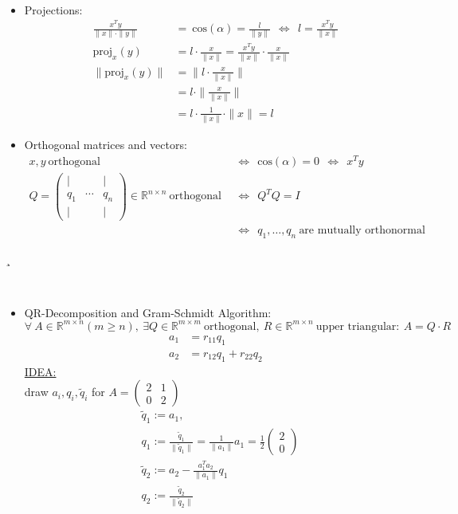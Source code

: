 \begin{frame}
	~\\
	{\blank
		\begin{itemize}\blank
			\item Projections:
			\begin{align*}
			\frac{x^Ty}{\|x\|\cdot\|y\|}&=~\text{cos}(\alpha) = \frac{l}{\|y\|}~~\Leftrightarrow~~l=\frac{x^Ty}{\|x\|}\\
			\text{proj}_x(y)&=l\cdot\frac{x}{\|x\|}=\frac{x^Ty}{\|x\|}\cdot\frac{x}{\|x\|}\\
			\|\text{proj}_x(y)\|&=\|l\cdot\frac{x}{\|x\|}\|\\
			&=l\cdot\|\frac{x}{\|x\|}\|\\
			&=l\cdot\frac{1}{\|x\|}\cdot \|x\|=l
			\end{align*}
			\item Orthogonal matrices and vectors:
			\begin{align*}
			x,y~\text{orthogonal}~~&\Leftrightarrow~~\text{cos}(\alpha)=0~~\Leftrightarrow~~x^Ty\\
			Q=\begin{pmatrix}
			|&~&|\\q_1&\cdots&q_n\\|&~&|
			\end{pmatrix}\in\mathbb{R}^{n\times n}~\text{orthogonal}~~&\Leftrightarrow~~Q^TQ = I\\
			&\Leftrightarrow~~q_1,\dots,q_n~\text{are mutually orthonormal}
			\end{align*}
		\end{itemize}¸
	}
\end{frame}

\begin{frame}
	~\\
	{\blank
		\begin{itemize}\blank
			\item QR-Decomposition and Gram-Schmidt Algorithm:\\
			$\forall~A\in\mathbb{R}^{m\times n} (m\geq n),~\exists Q\in\mathbb{R}^{m\times m}~\text{orthogonal},~R\in\mathbb{R}^{m\times n}~\text{upper triangular}:~A=Q\cdot R$
			\begin{align*}
			a_1 &= r_{11}q_1\\
			a_2 &=r_{12}q_1+r_{22}q_2
			\end{align*}
			\underline{IDEA:}\\
			draw $a_i,q_i,\tilde{q}_i$ for $A=\begin{pmatrix}2&1\\0&2\end{pmatrix}$
			\begin{align*}
			&\tilde{q}_1:=a_1,\\
			&q_1:= \frac{\tilde{q}_1}{\|\tilde{q}_1\|}=\frac{1}{\|a_1\|}a_1=\frac{1}{2}\begin{pmatrix}2\\0\end{pmatrix}\\
			&\tilde{q}_2:=a_2-\frac{a_1^Ta_2}{\|a_1\|}q_1\\
			&q_2:=\frac{\tilde{q}_2}{\|\tilde{q}_2\|}
			\end{align*}
		\end{itemize}
	}
\end{frame}

